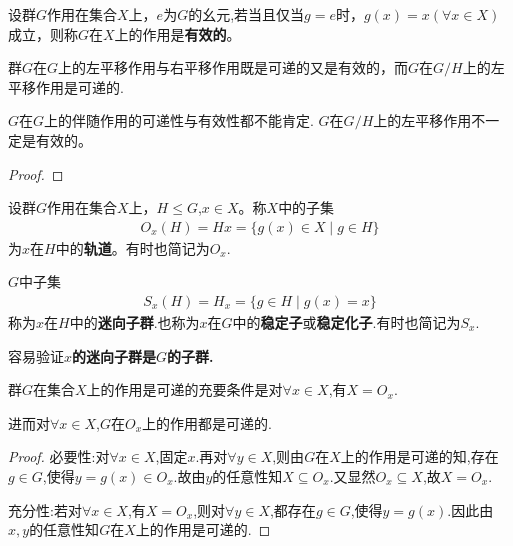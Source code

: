 \documentclass[../../main.tex]{subfiles}%
\begin{document}
\begin{definition}
设群$G$作用在集合$X$上，$e$为$G$的幺元,若当且仅当$g = e$时，$g(x) = x(\forall x \in X)$成立，则称$G$在$X$上的作用是\textbf{有效的}。
\end{definition}

\begin{proposition}
群$G$在$G$上的左平移作用与右平移作用既是可递的又是有效的，而$G$在$G/H$上的左平移作用是可递的.
\end{proposition}
\begin{remark}
$G$在$G$上的伴随作用的可递性与有效性都不能肯定.
$G$在$G/H$上的左平移作用不一定是有效的。
\end{remark}
\begin{proof}



\end{proof}

\begin{definition}
设群$G$作用在集合$X$上，$H\leqslant G$,$x \in X$。称$X$中的子集
\begin{align*}
O_x(H)=Hx = \{g(x)\in X \mid g \in H\}
\end{align*}
为$x$在$H$中的\textbf{轨道}。有时也简记为$O_x$.

$G$中子集
\begin{align*}
S_x(H)=H_x= \{g \in H\mid  g(x) = x\}
\end{align*}
称为$x$在$H$中的\textbf{迷向子群}.也称为$x$在$G$中的\textbf{稳定子}或\textbf{稳定化子}.有时也简记为$S_x$.
\end{definition}
\begin{remark}
容易验证\textbf{$x$的迷向子群是$G$的子群.}
\end{remark}

\begin{proposition}\label{proposition:可递的群作用X等于其轨道}
群$G$在集合$X$上的作用是可递的充要条件是对$\forall x \in X$,有$X=O_x$.

进而对$\forall x\in X$,$G$在$O_x$上的作用都是可递的.
\end{proposition}
\begin{proof}

{\heiti 必要性:}对$\forall x\in X$,固定$x$.再对$\forall y\in X$,则由$G$在$X$上的作用是可递的知,存在$g\in G$,使得$y=g(x)\in O_x$.故由$y$的任意性知$X\subseteq O_x$.又显然$O_x\subseteq X$,故$X=O_x$.

{\heiti 充分性:}若对$\forall x\in X$,有$X=O_x$,则对$\forall y\in X$,都存在$g\in G$,使得$y=g(x)$.因此由$x,y$的任意性知$G$在$X$上的作用是可递的.

\end{proof}
\end{document}
